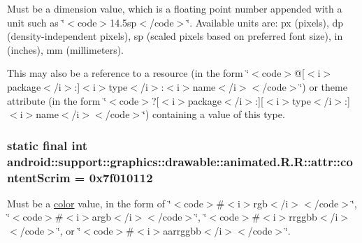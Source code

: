 Must be a dimension value, which is a floating point number appended with a unit such as \char`\"{}$<$code$>$14.5sp$<$/code$>$\char`\"{}. Available units are: px (pixels), dp (density-independent pixels), sp (scaled pixels based on preferred font size), in (inches), mm (millimeters). 

This may also be a reference to a resource (in the form \char`\"{}$<$code$>$@\mbox{[}$<$i$>$package$<$/i$>$:\mbox{]}$<$i$>$type$<$/i$>$:$<$i$>$name$<$/i$>$$<$/code$>$\char`\"{}) or theme attribute (in the form \char`\"{}$<$code$>$?\mbox{[}$<$i$>$package$<$/i$>$:\mbox{]}\mbox{[}$<$i$>$type$<$/i$>$:\mbox{]}$<$i$>$name$<$/i$>$$<$/code$>$\char`\"{}) containing a value of this type. \hypertarget{classandroid_1_1support_1_1graphics_1_1drawable_1_1animated_1_1_r_1_1attr_9c51522920fc3e41b06595ca9b671505}{
\subsubsection[{contentScrim}]{\setlength{\rightskip}{0pt plus 5cm}static final int android::support::graphics::drawable::animated.R.R::attr::contentScrim = 0x7f010112}}
\label{classandroid_1_1support_1_1graphics_1_1drawable_1_1animated_1_1_r_1_1attr_9c51522920fc3e41b06595ca9b671505}


Must be a \hyperlink{classandroid_1_1support_1_1graphics_1_1drawable_1_1animated_1_1_r_1_1color}{color} value, in the form of \char`\"{}$<$code$>$\#$<$i$>$rgb$<$/i$>$$<$/code$>$\char`\"{}, \char`\"{}$<$code$>$\#$<$i$>$argb$<$/i$>$$<$/code$>$\char`\"{}, \char`\"{}$<$code$>$\#$<$i$>$rrggbb$<$/i$>$$<$/code$>$\char`\"{}, or \char`\"{}$<$code$>$\#$<$i$>$aarrggbb$<$/i$>$$<$/code$>$\char`\"{}. 

